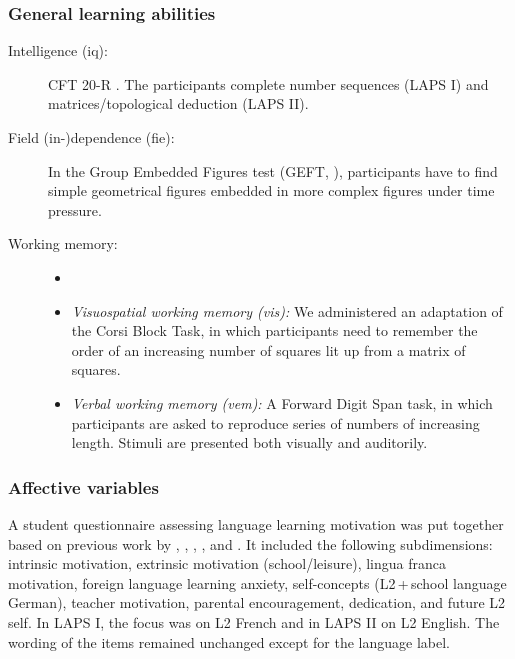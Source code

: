 \documentclass[output=paper]{langsci/langscibook}
\begin{document}
\subsubsection{General learning abilities}

\begin{description}
\item[Intelligence (iq):] CFT 20-R \citep{Weiss2006}. The participants complete number sequences (LAPS I) and matrices/topological deduction (LAPS II).

\item[Field (in-)dependence (fie):] In the Group Embedded Figures test (GEFT, \citealt{WitkinEtAl2014}), participants have to find simple geometrical figures embedded in more complex figures under time pressure.

\item[Working memory:]
\begin{itemize}
\item[]
\item \textit{Visuospatial working memory (vis):} We administered an adaptation of the Corsi Block Task, in which participants need to remember the order of an increasing number of squares lit up from a matrix of squares.
\item \textit{Verbal working memory (vem):} A Forward Digit Span task, in which participants are asked to reproduce series of numbers of increasing length. Stimuli are presented both visually and auditorily.
\end{itemize}
\end{description}

\subsubsection{Affective variables}
\begin{sloppypar}
A student questionnaire assessing language learning motivation was put together based on previous work by \citet{HorwitzEtAl1986}, \citet{Stoeckli2004}, \citet{Doernyei2010}, \citet{Heinzmann2013}, and \citet{PeyerEtAl2016}. It included the following subdimensions: intrinsic motivation, extrinsic motivation (school/leisure), lingua franca motivation, foreign language learning anxiety, self-concepts (L2\,+\,school language German), teacher motivation, parental encouragement, dedication, and future L2 self. In LAPS I, the focus was on L2 French and in LAPS II on L2 English. The wording of the items remained unchanged except for the language label.
\end{sloppypar}
\end{document}
